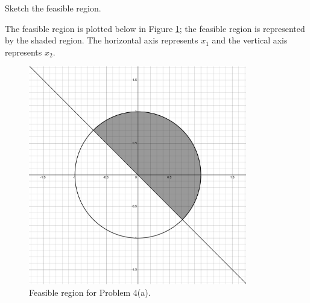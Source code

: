 Sketch the feasible region.

\begin{solution}
    The feasible region is plotted below in Figure \ref{fig:problem_4a}; the feasible
    region is represented by the shaded region. The horizontal axis represents $x_1$ and the vertical axis 
    represents $x_2$.

    \begin{figure}[h]
        \centering
        \includegraphics*[width=0.85\textwidth]{problem_4a.png}
        \caption{Feasible region for Problem 4(a).}
        \label{fig:problem_4a}
    \end{figure}
\end{solution}
